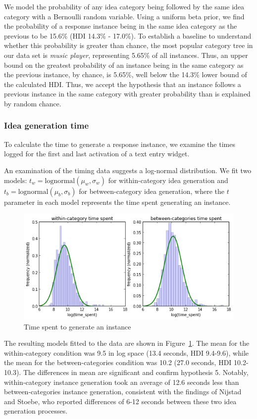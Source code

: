 We model the probability of any idea category being followed by the same idea category with a Bernoulli random variable. Using a uniform beta prior, we find the probability of a response instance being in the same idea category as the previous to be 15.6\% (HDI 14.3\% - 17.0\%). To establish a baseline to understand whether this probability is greater than chance, the most popular category tree in our data set is \emph{music player}, representing 5.65\% of all instances. Thus, an upper bound on the greatest probability of an instance being in the same category as the previous instance, by chance, is 5.65\%, well below the 14.3\% lower bound of the calculated HDI. Thus, we accept the hypothesis that an instance follows a previous instance in the same category with greater probability than is explained by random chance.

\subsubsection{Idea generation time}

To calculate the time to generate a response instance, we examine the times logged for the first and last activation of a text entry widget.

An examination of the timing data suggests a log-normal distribution. We fit two models: $t_w = \text{lognormal}(\mu_w, \sigma_w)$ for within-category idea generation and $t_b = \text{lognormal}(\mu_b, \sigma_b)$ for between-category idea generation, where the $t$ parameter in each model represents the time spent generating an instance.

\begin{figure}[h]
    \centering
    \includegraphics[width=0.9\columnwidth]{hyp5_comparison}
    \caption{Time spent to generate an instance}
    \label{fig:hyp5_comparison}
\end{figure}

The resulting models fitted to the data are shown in Figure~\ref{fig:hyp5_comparison}. The mean for the within-category condition was 9.5 in log space (13.4 seconds, HDI 9.4-9.6), while the mean for the between-categories condition was 10.2 (27.0 seconds, HDI 10.2-10.3). The differences in mean are significant and confirm hypothesis 5. Notably, within-category instance generation took an average of 12.6 seconds less than between-categories instance generation, consistent with the findings of Nijstad and Stoebe, who reported differences of 6-12 seconds between these two idea generation processes.

